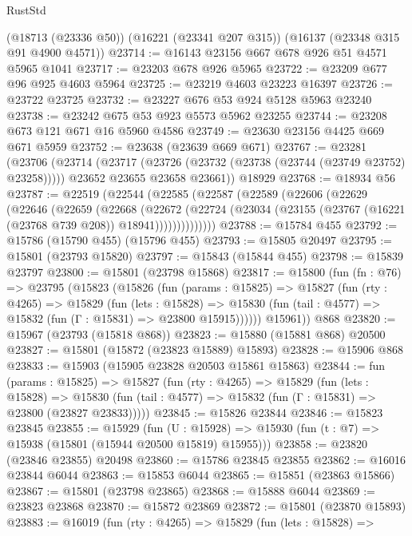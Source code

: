 \begin{lexlean}{RustStd}
\begin{coremodule}
    (@18713 (@23336 @50))
    (@16221 (@23341 @207 @315))
    (@16137 (@23348 @315 @91 @4900 @4571))
@23714 := @16143 @23156 @667 @678 @926 @51 @4571 @5965 @1041
@23717 := @23203 @678 @926 @5965
@23722 := @23209 @677 @96 @925 @4603 @5964
@23725 := @23219 @4603 @23223 @16397
@23726 := @23722 @23725
@23732 := @23227 @676 @53 @924 @5128 @5963 @23240
@23738 := @23242 @675 @53 @923 @5573 @5962 @23255
@23744 := @23208 @673 @121 @671 @16 @5960 @4586
@23749 := @23630 @23156 @4425 @669 @671 @5959
@23752 := @23638 (@23639 @669 @671)
@23767 := @23281
    (@23706
      (@23714
        (@23717 (@23726 (@23732 (@23738 (@23744 (@23749 @23752) @23258)))))
        @23652
        @23655
        @23658
        @23661))
    @18929
@23768 := @18934 @56
@23787 := @22519
    (@22544
      (@22585
        (@22587
          (@22589
            (@22606
              (@22629
                (@22646
                  (@22659
                    (@22668
                      (@22672
                        (@22724
                          (@23034 (@23155 (@23767 (@16221 (@23768 @739 @208)) @18941))))))))))))))
@23788 := @15784 @455
@23792 := @15786 (@15790 @455) (@15796 @455)
@23793 := @15805 @20497
@23795 := @15801 (@23793 @15820)
@23797 := @15843 (@15844 @455)
@23798 := @15839 @23797
@23800 := @15801 (@23798 @15868)
@23817 := @15800
    (fun (fn : @76) =>
    @23795
      (@15823
        (@15826
          (fun (params : @15825) =>
          @15827
            (fun (rty : @4265) =>
            @15829
              (fun (lets : @15828) =>
              @15830 (fun (tail : @4577) => @15832 (fun (Γ : @15831) => @23800 @15915))))))
        @15961))
    @868
@23820 := @15967 (@23793 (@15818 @868))
@23823 := @15880 (@15881 @868) @20500
@23827 := @15801 (@15872 (@23823 @15889) @15893)
@23828 := @15906 @868
@23833 := @15903 (@15905 @23828 @20503 @15861 @15863)
@23844 := fun (params : @15825) =>
  @15827
    (fun (rty : @4265) =>
    @15829
      (fun (lets : @15828) =>
      @15830 (fun (tail : @4577) => @15832 (fun (Γ : @15831) => @23800 (@23827 @23833)))))
@23845 := @15826 @23844
@23846 := @15823 @23845
@23855 := @15929
    (fun (U : @15928) => @15930 (fun (t : @7) => @15938 (@15801 (@15944 @20500 @15819) @15955)))
@23858 := @23820 (@23846 @23855) @20498
@23860 := @15786 @23845 @23855
@23862 := @16016 @23844 @6044
@23863 := @15853 @6044
@23865 := @15851 (@23863 @15866)
@23867 := @15801 (@23798 @23865)
@23868 := @15888 @6044
@23869 := @23823 @23868
@23870 := @15872 @23869
@23872 := @15801 (@23870 @15893)
@23883 := @16019
    (fun (rty : @4265) =>
    @15829
      (fun (lets : @15828) =>

\end{coremodule}
\end{lexlean}
